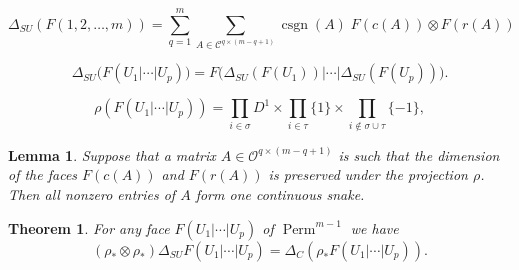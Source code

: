\documentclass[10pt,a4paper]{amsart}
\newtheorem{lemma}{Lemma}
\newtheorem{theorem}{Theorem}
\DeclareMathOperator{\Perm}{Perm}
\begin{document}
\begin{equation}\label{SU-diag}
\Delta_{SU}(F(1, 2, \ldots, m)) = \sum_{q = 1}^m \sum_{A \in \mathcal{C}^{q \times (m-q+1)}} \mathop{\mathrm{csgn}}(A)\; F(c(A)) \otimes F(r(A))
\end{equation}

\begin{equation}\label{comulrule}
  \Delta_{SU}\bigl(F(U_1| \cdots | U_p)\bigr) = 
  F\bigl(\Delta_{SU}(F(U_1)) \big| \cdots \big| \Delta_{SU}(F(U_p))\bigl).
\end{equation}

\begin{equation}\label{rho-face}
\rho \left({F(U_1 | \cdots | U_p) }\right) = \prod_{i \in \sigma}D^1 \times \prod_{i \in \tau} \{ 1 \} \times \prod_{i \notin \sigma \cup \tau} \{-1\},
\end{equation}

\begin{lemma}\label{snake}
Suppose that a matrix $A \in \mathcal{O}^{q \times (m-q+1)}$ 
is such that the dimension of the faces 
$F(c(A))$ and $F(r(A))$ is preserved under the projection $\rho$.
Then all nonzero entries of $A$ form one continuous snake. 

\end{lemma}

\begin{theorem}
For any face $F(U_1 | \cdots | U_p)$ of $\Perm^{m-1}$ we have
$$(\rho_* \otimes \rho_*) \Delta_{SU} F(U_1 | \cdots | U_p) = \Delta_{C}(\rho_* F(U_1 | \cdots | U_p)).$$
\end{theorem}
\end{document}
